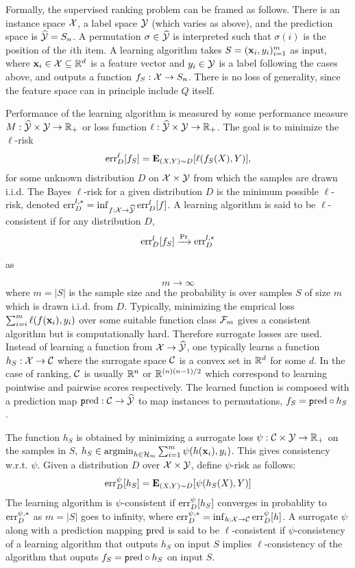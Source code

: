 Formally, the supervised ranking problem can be framed as follows. There is an
instance space ${\mathcal X}$, a label space ${\mathcal Y}$ (which varies as above), and the
prediction space is $\widehat{\mathcal{Y}} = S_n$. A permutation
$\sigma \in \widehat{\mathcal{Y}}$ is interpreted such that $\sigma(i)$ is the position of the
$i$th item. A learning algorithm
takes $S = ({\mathbf x}_i, y_i)_{i=1}^m$ as input,
where ${\mathbf x}_{i} \in {\mathcal X} \subseteq {\mathbb R}^d$ is a feature vector
and $y_i \in {\mathcal Y}$ is a label following the cases above,
and outputs a function
$f_S: {\mathcal X} \to S_n$.
There is no loss of generality, since the feature space can in principle 
include $Q$ itself.

Performance of the learning algorithm is measured by some performance measure
$M: \widehat{\mathcal{Y}} \times {\mathcal Y} \to {\mathbb R}_+$ or loss function
$\ell: \widehat{\mathcal{Y}} \times {\mathcal Y} \to {\mathbb R}_+$. The goal is to minimize the $\ell$-risk
\begin{align*}
  \text{err}_D^\ell[f_S] = {\mathbf E}_{({X}, Y) \sim D} [\ell(f_S({X}), Y)],
\end{align*}
for some unknown distribution $D$ on ${\mathcal X} \times {\mathcal Y}$ from which the samples are drawn i.i.d.
The Bayes $\ell$-risk for a given distribution $D$ is the minimum possible $\ell$-risk, denoted $\text{err}^{l,*}_D = \inf_{f:{\mathcal X} \to \widehat{\mathcal{Y}}} \text{err}^l_D[f]$. A learning algorithm is said to be $\ell$-consistent if for any distribution $D$,
$$\text{err}_D^l[f_S] \xrightarrow{\Pr} \text{err}_D^{l,*}$$
\begin{center}
 as
\end{center}
$$m \to \infty$$
where $m = |S|$ is the sample size and the probability is over samples $S$ of size $m$ which is drawn i.i.d. from $D$. Typically, minimizing the emprical loss $\sum_{i=i}^m \ell(f({\mathbf x}_i),y_i)$ over some suitable function class ${\mathcal F}_m$ gives a consistent algorithm but is computationally hard.  Therefore surrogate losses are used. Instead of learning a function from ${\mathcal X} \to \widehat{\mathcal{Y}}$, one typically learns a function $h_S:{\mathcal X} \to {\mathcal C}$ where the surrogate space ${\mathcal C}$ is a convex set in ${\mathbb R}^d$ for some $d$. In the case of ranking, ${\mathcal C}$ is usually ${\mathbb R}^n$ or ${\mathbb R}^{(n)(n-1)/2}$ which correspond to learning pointwise and pairwise scores respectively. The learned function is composed with a prediction map $\text{\texttt pred}: {\mathcal C} \to \widehat{\mathcal{Y}}$ to map instances to permutations, $f_S = \text{\texttt pred} \circ h_S$.

The function $h_S$ is obtained by minimizing a surrogate loss $\psi:{\mathcal C} \times {\mathcal Y} \to {\mathbb R}_+$ on the samples in $S$, $h_S \in \textup{\textrm{argmin}}_{h\in{\mathcal H}_m}\sum_{i=1}^m \psi(h({\mathbf x}_i),y_i)$. This gives consistency w.r.t. $\psi$. Given a distribution $D$ over ${\mathcal X} \times {\mathcal Y}$, define $\psi$-risk as follows:
$$\text{err}_D^\psi[h_S] = {\mathbf E}_{(X,Y)\sim D}[\psi(h_S(X),Y)]$$
The learning algorithm is $\psi$-consistent if $\text{err}_D^\psi[h_S]$ converges in probablity to $\text{err}_D^{\psi,*}$ as $m = |S|$ goes to infinity, where $\text{err}_D^{\psi,*} = \inf_{h:{\mathcal X} \to {\mathcal C}}\text{err}_D^\psi[h]$. A surrogate $\psi$ along with a prediction mapping $\text{\texttt pred}$ is said to be $\ell$-consistent if $\psi$-consistency of a learning algorithm that outputs $h_S$ on input $S$ implies $\ell$-consistency of the algorithm that ouputs $f_S = \text{\texttt pred} \circ h_S$ on input $S$.

